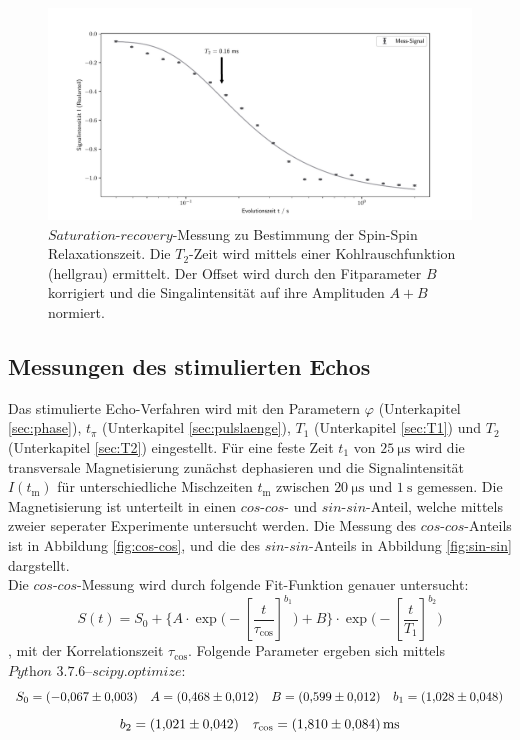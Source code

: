 \begin{figure}[H]
    \centering
    \includegraphics[width=\textwidth]{Auswertung/T2.pdf}
    \caption{$\textit{Saturation-recovery}$-Messung zu Bestimmung der Spin-Spin
    Relaxationszeit. Die $T_2$-Zeit wird mittels einer Kohlrauschfunktion (hellgrau)
    ermittelt. Der Offset wird durch den Fitparameter $B$ korrigiert und die
    Singalintensität auf ihre Amplituden $A+B$ normiert.}
    \label{fig:T2}
\end{figure}

\subsection{Messungen des stimulierten Echos}
\label{sec:stecho}
Das stimulierte Echo-Verfahren wird mit den Parametern $\varphi$ (Unterkapitel
\ref{sec:phase}), $t_{\pi}$ (Unterkapitel \ref{sec:pulslaenge}), $T_1$
(Unterkapitel \ref{sec:T1}) und $T_2$ (Unterkapitel \ref{sec:T2}) eingestellt.
Für eine feste Zeit $t_1$ von $\SI{25}{\micro\second}$ wird die transversale
Magnetisierung zunächst dephasieren
und die Signalintensität $I(t_{\text{m}})$ für unterschiedliche Mischzeiten
$t_{\text{m}}$ zwischen $\SI{20}{\micro\second}$ und $\SI{1}{\second}$ gemessen.
Die Magnetisierung ist unterteilt in einen $cos$-$cos$- und $sin$-$sin$-Anteil, welche
mittels zweier seperater Experimente untersucht werden. Die Messung des
$cos$-$cos$-Anteils ist in Abbildung \ref{fig:cos-cos}, und die des $sin$-$sin$-Anteils
in Abbildung \ref{fig:sin-sin} dargstellt.\\
Die $cos$-$cos$-Messung wird durch folgende Fit-Funktion genauer untersucht:
\begin{equation*}
  S(t) = S_0 + \biggl\{
  A \cdot \exp\biggl(-\left[\frac{t}{\tau_{\text{cos}}} \right]^{b_1}
  \biggr) + B
  \biggr\} \cdot
  \exp\biggl(-\left[\frac{t}{T_1} \right]^{b_2}
  \biggr)
\end{equation*}
\noindent,
mit der Korrelationszeit $\tau_{\text{cos}}$. Folgende Parameter ergeben sich
mittels $\textit{Python 3.7.6--scipy.optimize}$:
\begin{equation*}
  S_0 = \SI{-0.067\pm0.003}{}
  \quad
  A   = \SI{0.468\pm0.012}{}
  \quad
  B   = \SI{0.599\pm0.012}{}
  \quad
  b_1 = \SI{1,028\pm0,048}{}
\end{equation*}
\begin{equation*}
  b_2 = \SI{1,021\pm0.042}{}
  \quad
  \tau_{\text{cos}} = \SI{1,810\pm0,084}{\milli\second}
\end{equation*}

